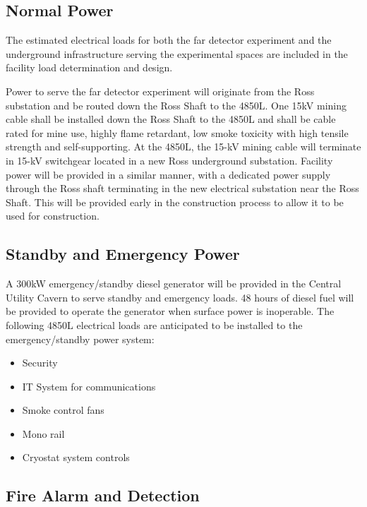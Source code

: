 \subsection{Normal Power}
\label{sec:fscf-und-norm-pwr}

The estimated electrical loads for both the far detector experiment and the underground infrastructure serving the experimental spaces are included in the facility load determination and design. 

Power to serve the far detector experiment will originate from the Ross substation and be routed down the Ross Shaft to the 4850L. One 15kV mining cable shall be installed down the Ross Shaft to the 4850L and shall be cable rated for mine use, highly flame retardant, low smoke toxicity with high tensile strength and self-supporting. At the 4850L, the 15-kV mining cable will terminate in 15-kV switchgear located in a new Ross underground substation. Facility power will be provided in a similar manner, with a dedicated power supply through the Ross shaft terminating in the new electrical substation near the Ross Shaft. This will be provided early in the construction process to allow it to be used for construction.

\subsection{Standby and Emergency Power}
\label{sec:fscf-und-emerg-pwr}

A 300kW emergency/standby diesel generator will be provided in the Central Utility Cavern to serve standby and emergency loads. 48 hours of diesel fuel will be provided to operate the generator when surface power is inoperable. The following 4850L electrical loads are anticipated to be installed to the emergency/standby power system:

\begin{itemize}
 \item Security
 \item IT System for communications
 \item Smoke control fans
 \item Mono rail
 \item Cryostat system controls
\end{itemize}

\subsection{Fire Alarm and Detection}
\label{sec:fscf-und-fire-alarm}

